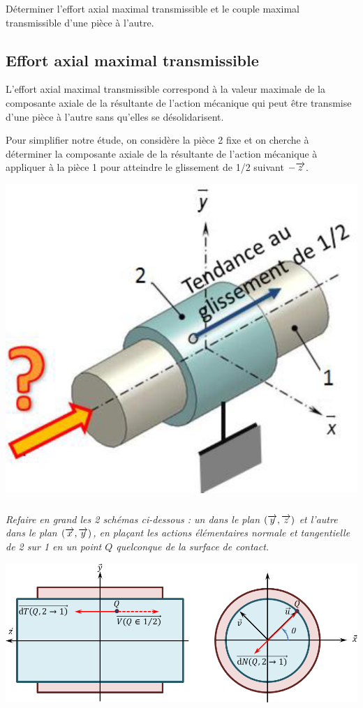 \documentclass[10pt,fleqn]{article} %
\begin{document}
\begin{multicols}{2}
\begin{multicols}{2}
\begin{obj}
Déterminer l’effort axial maximal transmissible et le couple maximal transmissible d’une pièce à 
l’autre.
\end{obj}

\subsection*{Effort axial maximal transmissible}

L’effort axial maximal transmissible correspond à la valeur maximale de la 
composante axiale de la résultante de l’action mécanique qui peut être transmise 
d’une pièce à l’autre sans qu’elles se désolidarisent. 
 
Pour simplifier notre étude, on considère la pièce 2 fixe et on cherche à déterminer 
la composante axiale de la résultante de l’action mécanique à appliquer à la pièce 1 
pour atteindre le glissement de 1/2 suivant $-\overrightarrow{z}$. 


\begin{center}
\includegraphics[width=.7\linewidth]{images/fig_02}
\end{center}

\subparagraph{}
\textit{Refaire en grand les 2 schémas ci-dessous : un dans le plan $(\overrightarrow{y}, \overrightarrow{z})$ et l’autre dans le plan $(\overrightarrow{x}, \overrightarrow{y})$, en plaçant les actions élémentaires normale et tangentielle de 2 sur 1 en un point $Q$ quelconque de la surface de contact. }

\ifprof
\begin{corrige}
\begin{center}
\includegraphics[width=\linewidth]{images/cor_01}
\end{center}


\end{corrige}
\end{multicols}
\end{multicols}
\end{document}
